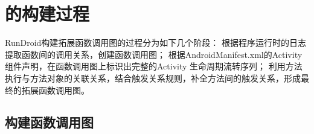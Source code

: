 {\begin{table}[!ht]
{\begin{threeparttable}[b]
\begin{tabular}{|l|c|}
				
				
				
			\end{tabular}
			
			
		\end{threeparttable}
	}
\end{table}
}
\section{\ecg 的构建过程}

RunDroid构建拓展函数调用图的过程分为如下几个阶段：
根据程序运行时的日志提取函数间的调用关系，创建函数调用图；
根据AndroidManifest.xml的Activity组件声明，在函数调用图上标识出完整的Activity 生命周期流转序列；
利用方法执行与方法对象的关联关系，结合触发关系规则，补全方法间的触发关系，形成最终的拓展函数调用图。



\subsection{构建函数调用图}


